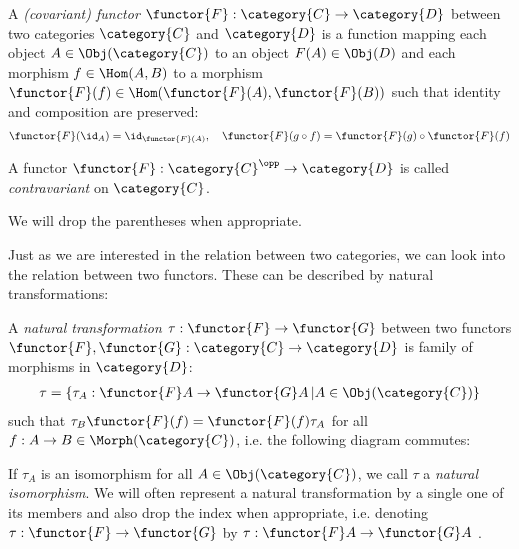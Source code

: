 \documentclass[DIN, pagenumber=false, fontsize=11pt, parskip=half, colorinlistoftodos, svgnames]{scrartcl}
\begin{document}
	\begin{definition}[Functor]
		\label{def: functor}
		A \emph{(covariant) functor} $\functor{F}: \category{C} \rightarrow \category{D} $ between two categories $\category{C}$ and $\category{D} $ is a function mapping each object $A \in  \Obj(\category{C}) $ to an object $F(A) \in \Obj(D) $ and each morphism $ f \in \Hom(A,B) $ to a morphism $\functor{F}(f) \in \Hom(\functor{F}(A), \functor{F}(B))$ such that identity and composition are preserved:
		\begin{align*}
			\functor{F}(\id_A) = \id_{\functor{F}(A)},
			\quad
			\functor{F}(g\circ f) = \functor{F}(g) \circ \functor{F}(f)
		\end{align*}
		
		A functor $\functor{F}: \category{C}^\opp \rightarrow \category{D} $ is called \emph{contravariant} on $\category{C} $.
		
		We will drop the parentheses when appropriate.
	\end{definition}
	
	Just as we are interested in the relation between two categories, we can look into the relation between two functors. These can be described by natural transformations:
	
	\begin{definition}
		\label{def: natTrans}
		A \emph{natural transformation} $\tau: \functor{F} \rightarrow \functor{G} $ between two functors $\functor{F}, \functor{G}: \category{C} \rightarrow \category{D} $ is family of morphisms in $\category{D}$:
		\begin{align*}
			\tau = \{ \tau_A : \functor{F}A \rightarrow \functor{G}A \,| A \in \Obj(\category{C})\}
		\end{align*}
		such that $\tau_B\functor{F}(f) = \functor{F}(f)\tau_A $ for all $f: A \rightarrow B \in \Morph(\category{C}) $, i.e. the following diagram commutes:
		
		\begin{center}
		\end{center}
		
		If $\tau_A$ is an isomorphism for all $A \in \Obj(\category{C}) $, we call $\tau$ a \emph{natural} \emph{isomorphism}.
		We will often represent a natural transformation by a single one of its members and also drop the index when appropriate, i.e. denoting 
		$\tau: \functor{F} \rightarrow \functor{G} $ 
		by 
		$\tau : \functor{F}A \rightarrow \functor{G}A $ .
	\end{definition}
	
\end{document}
